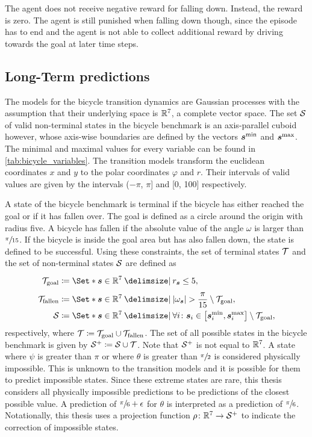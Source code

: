 The agent does not receive negative reward for falling down.
Instead, the reward is zero.
The agent is still punished when falling down though, since the episode has to end and the agent is not able to collect additional reward by driving towards the goal at later time steps.

\subsection{Long-Term predictions}
\label{sub:map_predictions}
The models for the bicycle transition dynamics are Gaussian processes with the assumption that their underlying space is $\mathbb{R}^7$, a complete vector space.
The set $\mathcal{S}$ of valid non-terminal states in the bicycle benchmark is an axis-parallel cuboid however, whose axis-wise boundaries are defined by the vectors $\bm{s}^{\text{min}}$ and $\bm{s}^{\text{max}}$.
The minimal and maximal values for every variable can be found in \cref{tab:bicycle_variables}.
The transition models transform the euclidean coordinates $x$ and $y$ to the polar coordinates $\varphi$ and $r$.
Their intervals of valid values are given by the intervals ($-\pi$, $\pi$] and [0, 100] respectively.

A state of the bicycle benchmark is terminal if the bicycle has either reached the goal or if it has fallen over.
The goal is defined as a circle around the origin with radius five.
A bicycle has fallen if the absolute value of the angle $\omega$ is larger than $\sfrac{\pi}{15}$.
If the bicycle is inside the goal area but has also fallen down, the state is defined to be successful.
Using these constraints, the set of terminal states $\mathcal{T}$ and the set of non-terminal states $\mathcal{S}$ are defined as
\begin{align}
    \Goal &\coloneqq \Set*{\mat{s} \in \R^7 \with r_{\mat{s}} \leq 5 \vphantom{\frac{\pi}{15}}}, \\
    \Fallen &\coloneqq \Set*{\mat{s} \in \R^7 \with \abs{\omega_{\mat{s}}} > \frac{\pi}{15}} \setminus \Goal, \\
    \Es &\coloneqq \Set*{\mat{s} \in \R^7 \with \forall i \colon \mat{s}_i \in \left[ \mat{s}_i^{\text{min}}, \mat{s}_i^{\text{max}} \right]} \setminus \Goal,
\end{align}
respectively, where $\mathcal{T} \coloneqq \mathcal{T}_{\text{goal}} \cup \mathcal{T}_{\text{fallen}}$.
The set of all possible states in the bicycle benchmark is given by $\mathcal{S}^+ \coloneqq \mathcal{S} \cup \mathcal{T}$.
Note that $\mathcal{S}^+$ is not equal to $\mathbb{R}^7$.
A state where $\psi$ is greater than $\pi$ or where $\theta$ is greater than $\sfrac{\pi}{2}$ is considered physically impossible.
This is unknown to the transition models and it is possible for them to predict impossible states.
Since these extreme states are rare, this thesis considers all physically impossible predictions to be predictions of the closest possible value.
A prediction of $\sfrac{\pi}{6} + \epsilon$ for $\theta$ is interpreted as a prediction of $\sfrac{\pi}{6}$.
Notationally, this thesis uses a projection function $\squeeze \colon \R^7 \to \Es^+$ to indicate the correction of impossible states.

